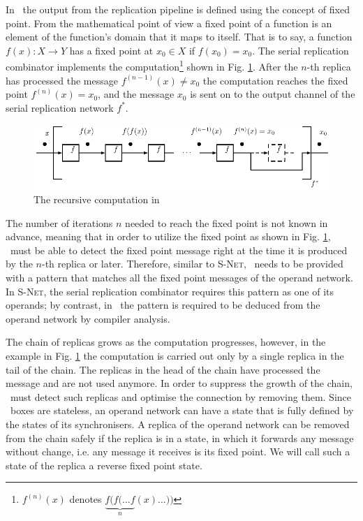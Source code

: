In \ak\, the output from the replication pipeline is defined using the concept of fixed point. From the mathematical point of view a fixed point of a function is an element of the function's domain that it maps to itself. That is to say, a function $f(x): X \to Y$ has a fixed point at $x_0 \in X$ if $f(x_0) = x_0$. The serial replication combinator implements the computation\footnote{$f^{(n)}(x)$ denotes $\underbrace{f(f(\dots f}_n (x) \dots))$} shown in Fig. \ref{fig:fp}. After the $n$-th replica has processed the message $f^{(n-1)}(x) \neq x_0$ the computation reaches the fixed point $f^{(n)}(x) = x_0$, and the message $x_0$ is sent on to the output channel of the serial replication network $f^{*}$.
\begin{figure}[h!]
\centering
\includegraphics[scale=0.8]{figs/chapter_03_fp.pdf}
\caption{The recursive computation in \ak\ }
\label{fig:fp}
\end{figure}

The number of iterations $n$ needed to reach the fixed point is not known in advance, meaning that in order to utilize the fixed point as shown in Fig. \ref{fig:fp}, \ak\ must be able to detect the fixed point message right at the time it is produced by the $n$-th replica or later. Therefore, similar to \textsc{S-Net}, \ak\ needs to be provided with a pattern that matches all the fixed point messages of the operand network. In \textsc{S-Net}, the serial replication combinator requires this pattern as one of its operands; by contrast, in \ak\ the pattern is required to be deduced from the operand network by compiler analysis.

The chain of replicas grows as the computation progresses, however, in the example in Fig. \ref{fig:fp} the computation is carried out only by a single replica in the tail of the chain. The replicas in the head of the chain have processed the message and are not used anymore. In order to suppress the growth of the chain, \ak\ must detect such replicas and optimise the connection by removing them. Since \ak\ boxes are stateless, an operand network can have a state that is fully defined by the states of its synchronisers. A replica of the operand network can be removed from the chain safely if the replica is in a state, in which it forwards any message without change, i.e. any message it receives is its fixed point. We will call such a state of the replica a reverse fixed point state.


